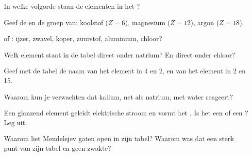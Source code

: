 \begin{exercise}[$\star$]\label{exo:g9:periodic-table-first-look:1}
In welke volgorde staan de elementen in het ?
\end{exercise}

\begin{exercise}[$\star$]\label{exo:g9:periodic-table-first-look:2}
Geef de  en de groep van: koolstof ($Z = 6$), magnesium
($Z = 12$), argon ($Z = 18$).
\end{exercise}

\begin{exercise}[$\star$]\label{exo:g9:periodic-table-first-look:3}
 of : ijzer, zwavel, koper, zuurstof, aluminium,
chloor?
\end{exercise}

\begin{exercise}[$\star$]\label{exo:g9:periodic-table-first-look:4}
Welk element staat in de tabel direct onder natrium? En direct onder
chloor?
\end{exercise}

\begin{exercise}[$\star\star$]\label{exo:g9:periodic-table-first-look:5}
Geef met de tabel de naam van het element in  4 en  2, en
van het element in  2 en  15.
\end{exercise}

\begin{exercise}[$\star\star$]\label{exo:g9:periodic-table-first-look:6}
Waarom kun je verwachten dat kalium, net als natrium, met water
reageert?
\end{exercise}

\begin{exercise}[$\star\star$]\label{exo:g9:periodic-table-first-look:7}
Een glanzend element geleidt elektrische stroom en vormt het 
. Is het een  of een ? Leg uit.
\end{exercise}

\begin{exercise}[$\star\star$]\label{exo:g9:periodic-table-first-look:8}
Waarom liet Mendelejev gaten open in zijn tabel? Waarom was dat een
sterk punt van zijn tabel en geen zwakte?
\end{exercise}

